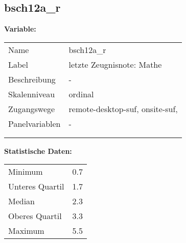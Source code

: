 	
	
	\subsection{bsch12a\_r}
	\label{subSection:bsch12a_r}

	\noindent\textbf{Variable:}\\
		\begin{tabular}{lL{11.3cm}}
			\label{tableVariable:bsch12a_r}
			Name & bsch12a\_r \\
			Label & letzte Zeugnisnote: Mathe \\
			Beschreibung & - \\
			Skalenniveau & ordinal \\
			Zugangswege &
				remote-desktop-suf,
				onsite-suf,
 \\
			Panelvariablen & -
			 \\
			 \\
 \\
		\end{tabular}



		\vspace*{1 cm}
		\noindent\textbf{Statistische Daten:}\\
			\begin{tabular}{ll}
				\label{tableStatistics:bsch12a_r}
					Minimum & 0.7 \\
					Unteres Quartil & 1.7 \\
					Median & 2.3 \\
					Oberes Quartil & 3.3 \\
					Maximum & 5.5 \\
			\end{tabular}



